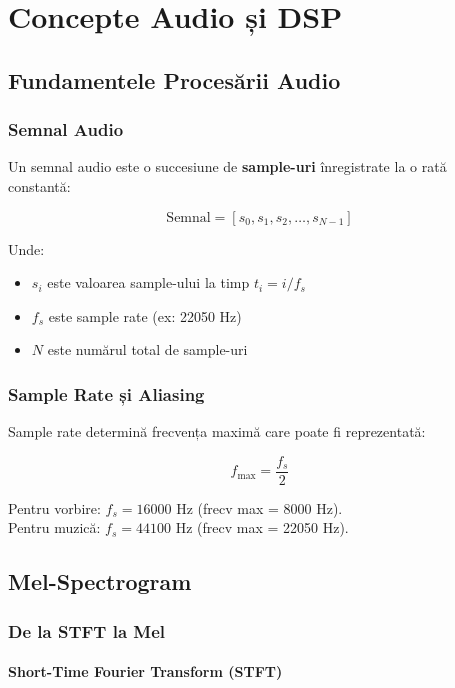 \documentclass[12pt,a4paper,oneside]{book}
\newcommand{\conceptbox}[2]{
\begin{tcolorbox}[colback=lightblue,colframe=darkblue,title=#1]
#2
\end{tcolorbox}
}
\begin{document}
\newpage

\chapter{Concepte Audio și DSP}

\section{Fundamentele Procesării Audio}

\subsection{Semnal Audio}

Un semnal audio este o succesiune de \textbf{sample-uri} înregistrate la o rată constantă:

$$\text{Semnal} = [s_0, s_1, s_2, \ldots, s_{N-1}]$$

Unde:
\begin{itemize}
    \item $s_i$ este valoarea sample-ului la timp $t_i = i / f_s$
    \item $f_s$ este sample rate (ex: 22050 Hz)
    \item $N$ este numărul total de sample-uri
\end{itemize}

\subsection{Sample Rate și Aliasing}

\conceptbox{Sample Rate și Nyquist}{
Sample rate determină frecvența maximă care poate fi reprezentată:

$$f_{\text{max}} = \frac{f_s}{2}$$

Pentru vorbire: $f_s = 16000$ Hz (frecv max = 8000 Hz).
\\
Pentru muzică: $f_s = 44100$ Hz (frecv max = 22050 Hz).
}

\section{Mel-Spectrogram}

\subsection{De la STFT la Mel}

\subsubsection{Short-Time Fourier Transform (STFT)}
\end{document}
